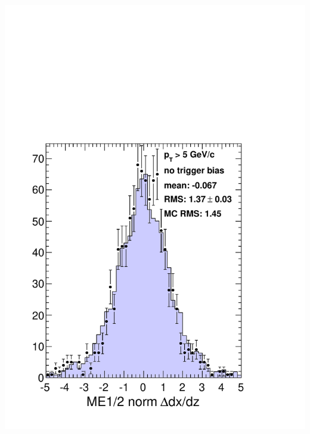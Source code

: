 \documentclass[compress]{beamer}
\begin{document}
\begin{frame}
\begin{columns}
\includegraphics[width=\linewidth]{me12_dXdZnorm.pdf}
\end{columns}
\end{frame}
\end{document}
